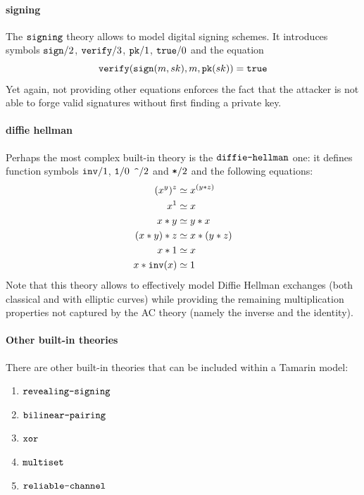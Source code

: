 \documentclass{article}
\newcommand{\mono}[1]{\textrm{\tt #1}}
\begin{document}
\paragraph{signing}
The $\mono{signing}$ theory allows to model digital signing schemes. It introduces symbols $\mono{sign}/2$, $\mono{verify}/3$, $\mono{pk}/1$, $\mono{true}/0$ and the equation
\begin{equation*}
    \mono{verify}(\mono{sign}(m,sk), m, \mono{pk}(sk)) = \mono{true}
\end{equation*}
Yet again, not providing other equations enforces the fact that the attacker is not able to forge valid signatures without first finding a private key.

\paragraph{diffie hellman}
Perhaps the most complex built-in theory is the $\mono{diffie-hellman}$ one: it defines function symbols $\mono{inv}/1$, $\mono{1}/0$ $\mono{\textasciicircum}/2$ and $\mono{*}/2$ and the following equations:
\begin{align*}
    (x^y)^z  &\simeq x^{(y*z)}\\
    x^1      &\simeq x\\
    x*y      &\simeq y*x\\
    (x*y)*z  &\simeq x*(y*z)\\
    x*1      &\simeq x\\
    x*\mono{inv}(x) &\simeq 1
\end{align*}
Note that this theory allows to effectively model Diffie Hellman exchanges (both classical and with elliptic curves) while providing the remaining multiplication properties not captured by the AC theory (namely the inverse and the identity).

\paragraph{Other built-in theories}
There are other built-in theories that can be included within a Tamarin model:

\begin{enumerate}
    \item $\mono{revealing-signing}$
    \item $\mono{bilinear-pairing}$
    \item $\mono{xor}$
    \item $\mono{multiset}$
    \item $\mono{reliable-channel}$
\end{enumerate}
\end{document}
